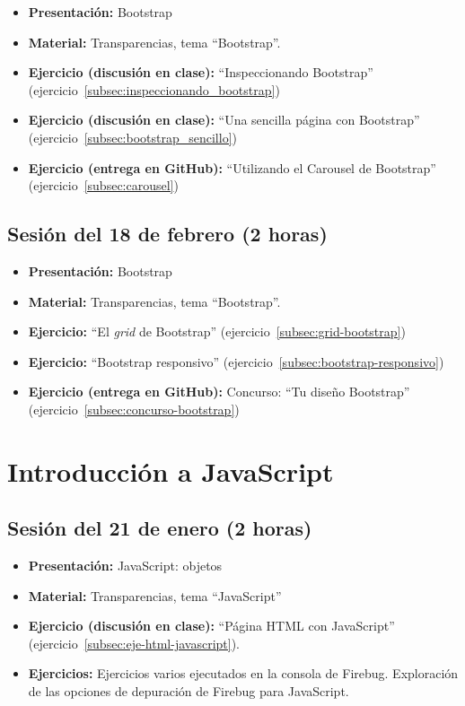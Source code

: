 \documentclass[a4paper,12pt]{report}
\begin{document}
\begin{itemize}
\item \textbf{Presentación:} Bootstrap
\item \textbf{Material:} Transparencias, tema ``Bootstrap''.
\item \textbf{Ejercicio (discusión en clase):} ``Inspeccionando Bootstrap'' (ejercicio~\ref{subsec:inspeccionando_bootstrap})
\item \textbf{Ejercicio (discusión en clase):} ``Una sencilla página con Bootstrap'' (ejercicio~\ref{subsec:bootstrap_sencillo})
\item \textbf{Ejercicio (entrega en GitHub):} ``Utilizando el Carousel de Bootstrap'' (ejercicio~\ref{subsec:carousel})

\end{itemize}

\subsection{Sesión del 18 de febrero (2 horas)}

\begin{itemize}
\item \textbf{Presentación:} Bootstrap
\item \textbf{Material:} Transparencias, tema ``Bootstrap''.
\item \textbf{Ejercicio:} ``El \emph{grid} de Bootstrap'' (ejercicio~\ref{subsec:grid-bootstrap})
\item \textbf{Ejercicio:} ``Bootstrap responsivo'' (ejercicio~\ref{subsec:bootstrap-responsivo})
\item \textbf{Ejercicio (entrega en GitHub):} Concurso: ``Tu diseño Bootstrap'' (ejercicio~\ref{subsec:concurso-bootstrap})
\end{itemize}


\section{Introducción a JavaScript}

\subsection{Sesión del 21 de enero (2 horas)}

\begin{itemize}
\item \textbf{Presentación:} JavaScript: objetos
\item \textbf{Material:} Transparencias, tema ``JavaScript''
\item \textbf{Ejercicio (discusión en clase):} ``Página HTML con JavaScript'' (ejercicio~\ref{subsec:eje-html-javascript}).
\item \textbf{Ejercicios:} Ejercicios varios ejecutados en la consola de Firebug. Exploración de las opciones de depuración de Firebug para JavaScript.
\end{itemize}
\end{document}
